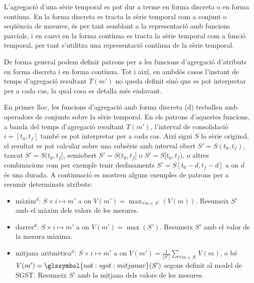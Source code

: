 L'agregació d'una sèrie temporal es pot dur a terme en forma discreta
o en forma contínua.  En la forma discreta es tracta la sèrie temporal
com a conjunt o seqüència de mesures, és per tant semblant a la
representació amb funcions parcials, i en canvi en la forma contínua
es tracta la sèrie temporal com a funció temporal, per tant s'utilitza
una representació contínua de la sèrie temporal.

De forma general podem definir patrons per a les funcions d'agregació
d'atributs en forma discreta i en forma contínua. Tot i així, en
ambdós casos l'instant de temps d'agregació resultant $T(m')$ no queda
definit sinó que es pot interpretar per a cada cas, la qual cosa es detalla
més endavant.


En primer lloc, les funcions d'agregació amb forma discreta (d)
treballen amb operadors de conjunts sobre la sèrie temporal. En els
patrons d'aquestes funcions, a banda del temps d'agregació resultant
$T(m')$, l'interval de consolidació $i=[t_0,t_f]$ també es pot
interpretar per a cada cas. Així sigui $S$ la sèrie original, el
resultat es pot calcular sobre una subsèrie amb interval obert
$S'=S(t_0,t_f)$, tancat $S'=S(t_0,t_f]$, semiobert $S'=S(t_0,t_f]$ o
$S'=S[t_0,t_f)$, o altres combinacions com per exemple tenir
desfasaments $S'=S[t_0-d,t_f-d]$ a on $d$ és una durada. A continuació
es mostren alguns exemples de patrons per a resumir determinats
atributs:
\begin{itemize}
\item màxim$^d$: $S \times i \mapsto m'$ a on $V(m') = \max_{\forall m
    \in S'}(V(m))$. Resumeix $S'$ amb el màxim dels valors de les
  mesures.


\item darrer$^d$: $S \times i \mapsto m'$ a on $V(m') =
  \max(S')$. Resumeix $S'$ amb el valor de la mesura màxima.
\item mitjana aritmètica$^d$: $S \times i \mapsto m'$ a on $V(m') =
  \frac{1}{|S'|} \sum\limits_{\forall m\in S'} V(m)$, o bé $V(m') =
  \glssymbol{not:sgst:mitjanav}(S')$ segons definit al model de
  SGST. Resumeix $S'$ amb la mitjana dels valors de les mesures.
\end{itemize}


